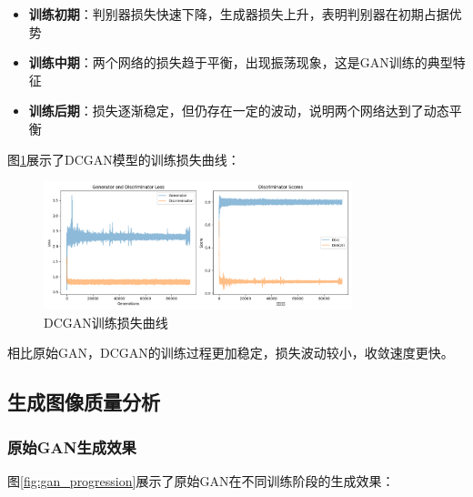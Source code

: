 \documentclass[UTF8]{ctexart}
\begin{document}
\begin{itemize}
\item \textbf{训练初期}：判别器损失快速下降，生成器损失上升，表明判别器在初期占据优势
\item \textbf{训练中期}：两个网络的损失趋于平衡，出现振荡现象，这是GAN训练的典型特征
\item \textbf{训练后期}：损失逐渐稳定，但仍存在一定的波动，说明两个网络达到了动态平衡
\end{itemize}

图\ref{fig:dcgan_curves}展示了DCGAN模型的训练损失曲线：

\begin{figure}[H]
\centering
\includegraphics[width=0.8\textwidth]{training_curves.png}
\caption{DCGAN训练损失曲线}
\label{fig:dcgan_curves}
\end{figure}

相比原始GAN，DCGAN的训练过程更加稳定，损失波动较小，收敛速度更快。

\subsection{生成图像质量分析}

\subsubsection{原始GAN生成效果}

图\ref{fig:gan_progression}展示了原始GAN在不同训练阶段的生成效果：
\end{document}
